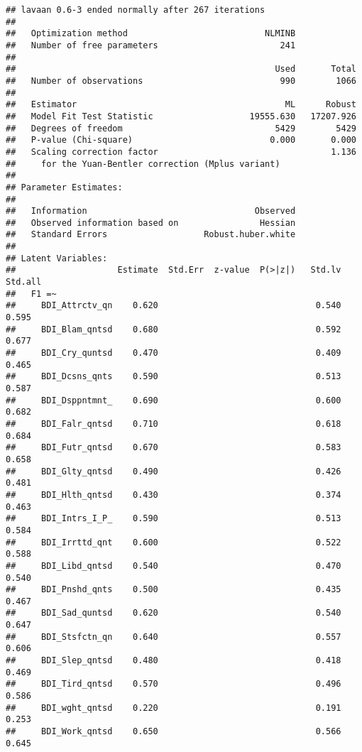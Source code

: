 \documentclass[]{article}
\begin{document}
\begin{verbatim}
## lavaan 0.6-3 ended normally after 267 iterations
## 
##   Optimization method                           NLMINB
##   Number of free parameters                        241
## 
##                                                   Used       Total
##   Number of observations                           990        1066
## 
##   Estimator                                         ML      Robust
##   Model Fit Test Statistic                   19555.630   17207.926
##   Degrees of freedom                              5429        5429
##   P-value (Chi-square)                           0.000       0.000
##   Scaling correction factor                                  1.136
##     for the Yuan-Bentler correction (Mplus variant)
## 
## Parameter Estimates:
## 
##   Information                                 Observed
##   Observed information based on                Hessian
##   Standard Errors                   Robust.huber.white
## 
## Latent Variables:
##                    Estimate  Std.Err  z-value  P(>|z|)   Std.lv  Std.all
##   F1 =~                                                                 
##     BDI_Attrctv_qn    0.620                               0.540    0.595
##     BDI_Blam_qntsd    0.680                               0.592    0.677
##     BDI_Cry_quntsd    0.470                               0.409    0.465
##     BDI_Dcsns_qnts    0.590                               0.513    0.587
##     BDI_Dsppntmnt_    0.690                               0.600    0.682
##     BDI_Falr_qntsd    0.710                               0.618    0.684
##     BDI_Futr_qntsd    0.670                               0.583    0.658
##     BDI_Glty_qntsd    0.490                               0.426    0.481
##     BDI_Hlth_qntsd    0.430                               0.374    0.463
##     BDI_Intrs_I_P_    0.590                               0.513    0.584
##     BDI_Irrttd_qnt    0.600                               0.522    0.588
##     BDI_Libd_qntsd    0.540                               0.470    0.540
##     BDI_Pnshd_qnts    0.500                               0.435    0.467
##     BDI_Sad_quntsd    0.620                               0.540    0.647
##     BDI_Stsfctn_qn    0.640                               0.557    0.606
##     BDI_Slep_qntsd    0.480                               0.418    0.469
##     BDI_Tird_qntsd    0.570                               0.496    0.586
##     BDI_wght_qntsd    0.220                               0.191    0.253
##     BDI_Work_qntsd    0.650                               0.566    0.645

\end{verbatim}
\end{document}
